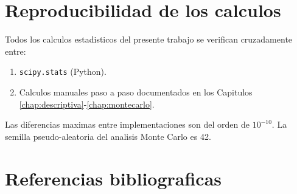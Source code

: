 \documentclass[12pt,a4paper,oneside]{book}
\begin{document}
\chapter{Reproducibilidad de los calculos}

Todos los calculos estadisticos del presente trabajo se verifican cruzadamente entre:
\begin{enumerate}
    \item \texttt{scipy.stats} (Python).
    \item Calculos manuales paso a paso documentados en los Capitulos \ref{chap:descriptiva}-\ref{chap:montecarlo}.
\end{enumerate}

Las diferencias maximas entre implementaciones son del orden de $10^{-10}$. La semilla pseudo-aleatoria del analisis Monte Carlo es 42.

\backmatter

\chapter*{Referencias bibliograficas}
\end{document}
